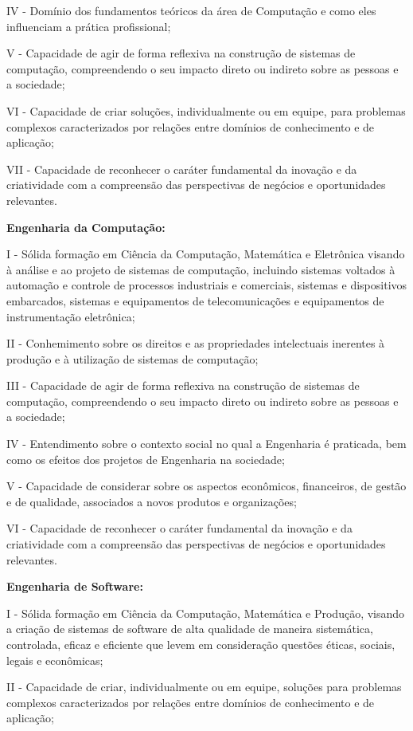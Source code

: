 IV - Domínio dos fundamentos teóricos da área de Computação e como eles
influenciam a prática profissional;

V - Capacidade de agir de forma reflexiva na construção de sistemas de computação, compreendendo o seu impacto direto ou indireto sobre as pessoas e a sociedade;

VI - Capacidade de criar soluções, individualmente ou em equipe, para
problemas complexos caracterizados por relações entre domínios de conhecimento e de aplicação;

VII - Capacidade de reconhecer o caráter fundamental da inovação e da criatividade com a compreensão das perspectivas de negócios e oportunidades relevantes.

\textbf{Engenharia da Computação:}

I - Sólida formação em Ciência da Computação, Matemática e
Eletrônica visando à análise e ao projeto de sistemas de computação, incluindo sistemas voltados à automação e controle de processos industriais e comerciais, sistemas e
dispositivos embarcados, sistemas e equipamentos de telecomunicações e equipamentos de instrumentação eletrônica;

II - Conhemimento sobre os direitos e as propriedades intelectuais inerentes à produção e à utilização de sistemas de computação;

III - Capacidade de agir de forma reflexiva na construção de sistemas de computação, compreendendo o seu impacto direto ou indireto sobre as pessoas e a sociedade;

IV - Entendimento sobre o contexto social no qual a Engenharia é praticada, bem como os efeitos dos projetos de Engenharia na sociedade;

V - Capacidade de considerar sobre os aspectos econômicos, financeiros, de gestão e de qualidade, associados a novos produtos e organizações;

VI - Capacidade de reconhecer o caráter fundamental da inovação e da criatividade com a compreensão das perspectivas de negócios e oportunidades relevantes.

\textbf{Engenharia de Software:}

I - Sólida formação em Ciência da Computação, Matemática e
Produção, visando a criação de sistemas de software de alta qualidade de maneira
sistemática, controlada, eficaz e eficiente que levem em consideração questões éticas, sociais, legais e econômicas;

II - Capacidade de criar, individualmente ou em equipe, soluções para
problemas complexos caracterizados por relações entre domínios de conhecimento e de aplicação;

